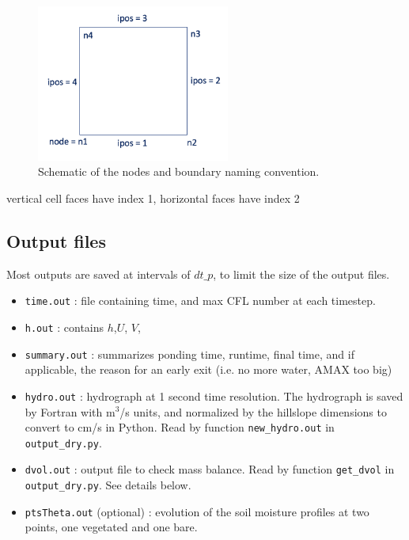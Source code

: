 \documentclass{article}
\newcommand{\code}[1]{\texttt{#1}}
\begin{document}
 \begin{figure}[h]
 \centering
\includegraphics[width=15pc]{grid/boundaries.png}
 \caption{Schematic of the nodes and boundary naming convention. }
 \label{nodes}
 \end{figure}
 


%
%


vertical cell faces have index 1,
horizontal faces have index 2


\subsection{Output files}
 Most outputs are saved at intervals of  $dt\_p$, to limit the size of the output files.

\begin{itemize}
	\item \code{time.out} : file containing time, and max CFL number at each timestep.
	\item \code{h.out} : contains $h$,$U$, $V$,
	\item \code{summary.out} : summarizes ponding time, runtime, final time, and if applicable, the reason for an early exit (i.e. no more water, AMAX too big) 
	\item \code{hydro.out} : hydrograph at 1 second time resolution.  The hydrograph is saved by Fortran with m$^3$/s units,  and normalized by the hillslope dimensions to convert to cm/s in Python. Read by function \code{new\_hydro.out} in \code{output\_dry.py}.
	\item \code{dvol.out} :  output file to check mass balance. Read by function \code{get\_dvol} in \code{output\_dry.py}. See details below.

	\item \code{ptsTheta.out} (optional) : evolution of the soil moisture profiles at two points, one vegetated and one bare. 
\end{itemize}
\end{document}
